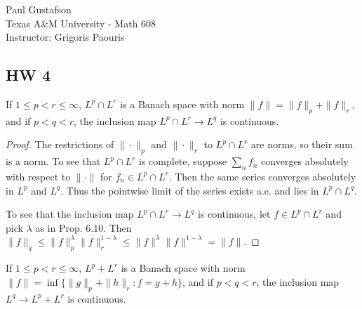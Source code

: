 \documentclass{article}
\begin{document}
\noindent Paul Gustafson\\
\noindent Texas A\&M University - Math 608 \\ 
\noindent Instructor: Grigoris Paouris

\subsection*{HW 4}
 If $1 \le p < r \le \infty$, $L^p \cap L^r$ is a Banach space with norm $\|f\| = \|f\|_p + \|f\|_r$, and if 
$p < q< r$, the inclusion map $L^p \cap L^r \to L^q$ is continuous.
\begin{proof}
The restrictions of $\|\cdot\|_p$ and $\|\cdot\|_r$ to $L^p \cap L^r$ are norms, so their sum is a norm.  To see that $L^p \cap L^r$ is complete, suppose $\sum_n f_n$ converges absolutely with respect to $\| \cdot \|$ for $f_n \in L^p \cap L^r$.  Then the same series converges absolutely in $L^p$ and $L^q$.  Thus the pointwise limit of the series exists a.e. and lies in $L^p \cap L^q$.

To see that the inclusion map $L^p \cap L^r \to L^q$ is continuous, let $f \in L^p \cap L^r$ and pick $\lambda$ as in Prop. 6.10.  Then $\|f\|_q \le \|f\|_p^\lambda \|f\|_r^{1 - \lambda} \le \|f\|^\lambda \|f\|^{1 - \lambda} = \|f\|$.
\end{proof}

 If $1 \le p < r \le \infty$, $L^p + L^r$ is a Banach space with norm $\|f\| = \inf\{\|g\|_p + \|h\|_r : f = g + h\}$, and if
$p < q < r$, the inclusion map $L^q \to L^p + L^r$ is continuous.
\end{document}
